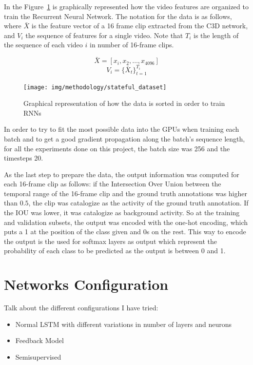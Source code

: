 In the Figure~\ref{fig:stateful_dataset} is graphically represented how the video features are organized to train the Recurrent Neural Network. The notation for the data is as follows, where $\bar{X}$ is the feature vector of a 16 frame clip extracted from the C3D network, and $V_i$ the sequence of features for a single video. Note that $T_i$ is the length of the sequence of each video $i$ in number of 16-frame clips.

\begin{equation}
	\bar{X} = [x_i, x_2, \ldots, x_{4096}]
\end{equation}
\begin{equation}
	V_i = \{ \bar{X}_t \}_{t=1}^{T_i}
\end{equation}

\begin{figure}[H]
\begin{center}
\texttt{[image: img/methodology/stateful\_dataset]}
\end{center}
\caption{Graphical representation of how the data is sorted in order to train RNNs}
\label{fig:stateful_dataset}
\end{figure}

In order to try to fit the most possible data into the GPUs when training each batch and to get a good gradient propagation along the batch's sequence length, for all the experiments done on this project, the batch size was 256 and the timesteps 20.

As the last step to prepare the data, the output information was computed for each 16-frame clip as follows: if the Intersection Over Union between the temporal range of the 16-frame clip and the ground truth annotations was higher than $0.5$, the clip was catalogize as the activity of the ground truth annotation. If the IOU was lower, it was catalogize as background activity. So at the training and validation subsets, the output was encoded with the one-hot encoding, which puts a 1 at the position of the class given and 0s on the rest. This way to encode the output is the used for softmax layers as output which represent the probability of each class to be predicted as the output is between 0 and 1.

\section{Networks Configuration}


Talk about the different configurations I have tried:
\begin{itemize}
    \item Normal LSTM with different variations in number of layers and neurons
    \item Feedback Model
    \item Semisupervised
\end{itemize}

